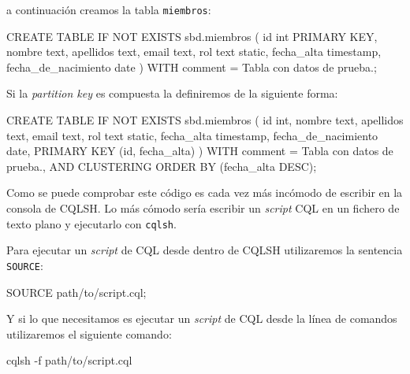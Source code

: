 \documentclass[
]{book}
\newenvironment{Shaded}{}{}
\newcommand{\AttributeTok}[1]{\textcolor[rgb]{0.49,0.56,0.16}{#1}}
\newcommand{\ExtensionTok}[1]{#1}
\newcommand{\NormalTok}[1]{#1}
\begin{document}
a continuación creamos la tabla \texttt{miembros}:

\begin{Shaded}
\begin{Highlighting}[]
\NormalTok{CREATE TABLE IF NOT EXISTS sbd.miembros (}
\NormalTok{    id int PRIMARY KEY,}
\NormalTok{    nombre text,}
\NormalTok{    apellidos text,}
\NormalTok{    email text,}
\NormalTok{    rol text static,}
\NormalTok{    fecha\_alta timestamp,}
\NormalTok{    fecha\_de\_nacimiento date}
\NormalTok{)}
\NormalTok{WITH comment = \textquotesingle{}Tabla con datos de prueba.\textquotesingle{};}
\end{Highlighting}
\end{Shaded}

Si la \emph{partition key} es compuesta la definiremos de la siguiente forma:

\begin{Shaded}
\begin{Highlighting}[]
\NormalTok{CREATE TABLE IF NOT EXISTS sbd.miembros (}
\NormalTok{    id int,}
\NormalTok{    nombre text,}
\NormalTok{    apellidos text,}
\NormalTok{    email text,}
\NormalTok{    rol text static,}
\NormalTok{    fecha\_alta timestamp,}
\NormalTok{    fecha\_de\_nacimiento date,}
\NormalTok{    PRIMARY KEY (id, fecha\_alta)}
\NormalTok{) WITH comment = \textquotesingle{}Tabla con datos de prueba.\textquotesingle{},}
\NormalTok{  AND CLUSTERING ORDER BY (fecha\_alta DESC);}
\end{Highlighting}
\end{Shaded}

Como se puede comprobar este código es cada vez más incómodo de escribir en la consola de CQLSH. Lo más cómodo sería escribir un \emph{script} CQL en un fichero de texto plano y ejecutarlo con \texttt{cqlsh}.

Para ejecutar un \emph{script} de CQL desde dentro de CQLSH utilizaremos la sentencia \texttt{SOURCE}:

\begin{Shaded}
\begin{Highlighting}[]
\NormalTok{SOURCE \textquotesingle{}path/to/script.cql\textquotesingle{};}
\end{Highlighting}
\end{Shaded}

Y si lo que necesitamos es ejecutar un \emph{script} de CQL desde la línea de comandos utilizaremos el siguiente comando:

\begin{Shaded}
\begin{Highlighting}[]
\ExtensionTok{cqlsh} \AttributeTok{{-}f}\NormalTok{ path/to/script.cql}
\end{Highlighting}
\end{Shaded}
\end{document}
